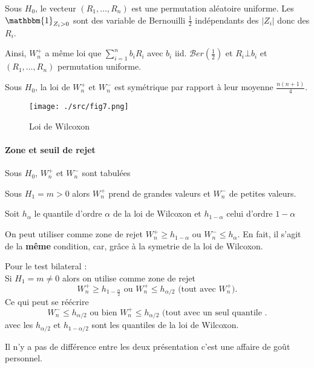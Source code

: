 \documentclass{article}
\theoremstyle{plain}%
\theoremstyle{definition}
\theoremstyle{remark}
\begin{document}
Sous $ H_0 $, le vecteur $ (R_1, \dots, R_n) $ est une permutation aléatoire uniforme. Les $ \mathbbm{1}_{Z_i > 0} $ sont des variable de Bernouilli $ \frac{1}{2} $ indépendants des $ \left| Z_i \right| $ donc des $ R_i $. 

Ainsi, $ W_n^+ $ a même loi que $ \sum_{i=1}^{n}b_i R_i $ avec $ b_i $ iid. $ \mathcal{B}er(\frac{1}{2}) $ et $ R_i \bot b_i  $ et $ (R_1, \dots, R_n) $ permutation uniforme.

Sous $ H_0 $, la loi de $ W_n^+ $ et $ W_n^- $ est symétrique par rapport à leur moyenne $ \frac{n(n+1)}{4} $. 

\begin{figure}[!htbp]
    \centering
    \caption{Loi de Wilcoxon}
    \texttt{[image: ./src/fig7.png]}
\end{figure}

\paragraph*{Zone et seuil de rejet}
Sous $ H_0 $, $ W_n^+ $ et $ W_n^- $ sont tabulées

Sous $ H_1 = m > 0 $ alors $ W_n^+ $ prend de grandes valeurs et $ W_n^- $ de petites valeurs.

Soit $ h_\alpha  $ le quantile d'ordre $ \alpha  $ de la loi de Wilcoxon et $ h_{1 - \alpha } $ celui d'ordre $ 1 - \alpha  $ 

On peut utiliser comme zone de rejet $ W_n^+ \geq h_{1 - \alpha }$ ou $ W_n^- \leq  h_\alpha  $. En fait, il s'agit de la \textbf{même} condition, car, grâce à la symetrie de la loi de Wilcoxon.

Pour le test bilateral : \\
Si $ H_1 = m \neq 0 $ alors on utilise comme zone de rejet 
\[
    W_n^+ \geq h_{1 - \frac{\alpha}{2}} \text{ ou } W_n^+ \leq h_{\alpha /2} \text{ (tout avec } W_n^+ \text{)}
.\]
Ce qui peut se réécrire 
\[
    W_n^- \leq h_{\alpha /2} \text{ ou bien } W_n^+ \leq h_{\alpha /2} \text{ (tout avec un seul quantile }
.\]
avec les $ h_{\alpha /2} $ et $ h_{1-\alpha /2} $ sont les quantiles de la loi de Wilcoxon.

Il n'y a pas de différence entre les deux présentation c'est une affaire de goût personnel. 
\end{document}
